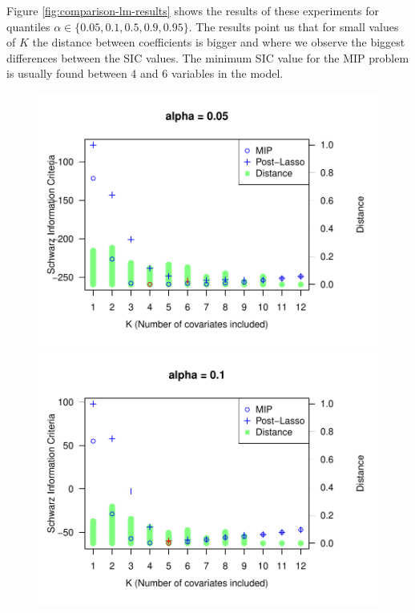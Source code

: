 Figure \ref{fig:comparison-lm-results} shows the results of these experiments for quantiles $\alpha \in \{0.05, 0.1, 0.5, 0.9, 0.95\}$. The results point us that for small values of $K$ the distance between coefficients is bigger and where we observe the biggest differences between the SIC values. The minimum SIC value for the MIP problem is usually found between 4 and 6 variables in the model.


\begin{figure}
  \centering
  \begin{minipage}[t]{0.4\linewidth}
    \centering
    \begin{minipage}[t]{\linewidth}
      \centering     \includegraphics[width=\textwidth]{Figuras/SIC005.pdf}
    \end{minipage}
    \begin{minipage}[b]{\linewidth}
      \centering     \includegraphics[width=\textwidth]{Figuras/SIC01.pdf}

\end{minipage}
\end{minipage}
\end{figure}
